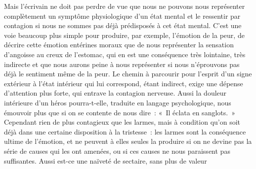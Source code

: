 \documentclass[french,twoside]{book} %
\begin{document}
Mais l’écrivain ne doit pas perdre de vue que nous ne pouvons nous représenter complètement un symptôme physiologique d’un état mental et le ressentir par contagion si nous ne sommes pas déjà prédisposés à cet état mental. C’est une voie beaucoup plus simple pour produire, par exemple, l’émotion de la peur, de décrire cette émotion entérines moraux que de nous représenter la sensation d’angoisse au creux de l’estomac, qui en est une conséquence très lointaine, très indirecte et que nous aurons peine à nous représenter si nous n’éprouvons pas déjà le sentiment même de la peur. Le chemin à parcourir pour l’esprit d’un signe extérieur à l’état intérieur qui lui correspond, étant indirect, exige une dépense d’attention plus forte, qui entrave la contagion nerveuse. Aussi la douleur intérieure d’un héros pourra-t-elle, traduite en langage psychologique, nous émouvoir plus que si on se contente de nous dire : « Il éclata en sanglots. » Cependant rien de plus contagieux que les larmes, mais à condition qu’on soit déjà dans une certaine disposition à la tristesse : les larmes sont la conséquence ultime de l’émotion, et ne peuvent à elles seules la produire si on ne devine pas la série de causes qui les ont amenées, ou si ces causes ne nous paraissent pas suffisantes. Aussi est-ce une naïveté de sectaire, sans plus de valeur\par
\end{document}

